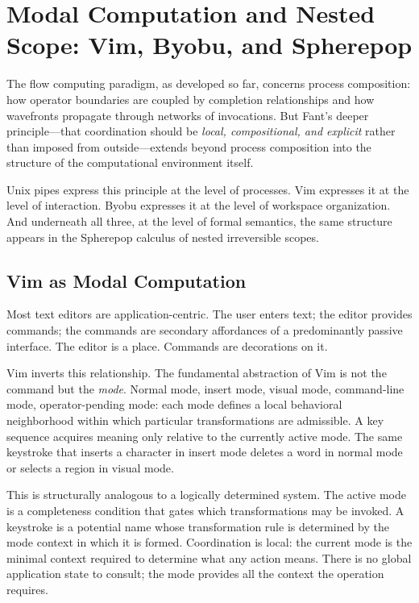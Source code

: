 \documentclass[12pt, a4paper]{article}
\begin{document}
\section{Modal Computation and Nested Scope: Vim, Byobu, and Spherepop}

The flow computing paradigm, as developed so far, concerns
process composition: how operator boundaries are coupled by
completion relationships and how wavefronts propagate through
networks of invocations. But Fant's deeper principle---that
coordination should be \emph{local, compositional, and explicit}
rather than imposed from outside---extends beyond process
composition into the structure of the computational environment
itself.

Unix pipes express this principle at the level of processes.
Vim expresses it at the level of interaction. Byobu expresses
it at the level of workspace organization. And underneath all
three, at the level of formal semantics, the same structure
appears in the Spherepop calculus of nested irreversible scopes.

\subsection{Vim as Modal Computation}

Most text editors are application-centric. The user enters text;
the editor provides commands; the commands are secondary
affordances of a predominantly passive interface. The editor is
a place. Commands are decorations on it.

Vim inverts this relationship. The fundamental abstraction of Vim
is not the command but the \emph{mode}. Normal mode, insert mode,
visual mode, command-line mode, operator-pending mode: each mode
defines a local behavioral neighborhood within which particular
transformations are admissible. A key sequence acquires meaning
only relative to the currently active mode. The same keystroke
that inserts a character in insert mode deletes a word in normal
mode or selects a region in visual mode.

This is structurally analogous to a logically determined system.
The active mode is a completeness condition that gates which
transformations may be invoked. A keystroke is a potential name
whose transformation rule is determined by the mode context in
which it is formed. Coordination is local: the current mode is
the minimal context required to determine what any action means.
There is no global application state to consult; the mode
provides all the context the operation requires.
\end{document}

